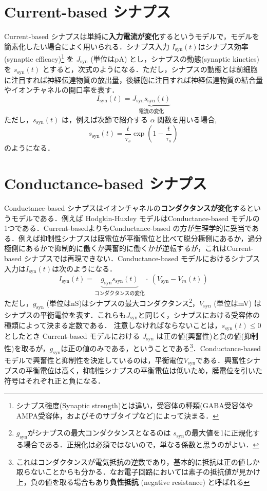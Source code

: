 \section{Current-based シナプス}
Current-based シナプスは単純に\textbf{入力電流が変化}するというモデルで，モデルを簡素化したい場合によく用いられる．シナプス入力 $I_{\text{syn}}(t)$はシナプス効率(synaptic efficacy)\footnote{シナプス強度(Synaptic strength)とは違い，受容体の種類(GABA受容体やAMPA受容体，およびそのサブタイプなど)によって決まる．} を $J_{\text{syn}}$ (単位はpA) とし，シナプスの動態(synaptic kinetics)を $s_{\text{syn}}(t)$ とすると，次式のようになる．ただし，シナプスの動態とは前細胞に注目すれば神経伝達物質の放出量，後細胞に注目すれば神経伝達物質の結合量やイオンチャネルの開口率を表す．
\begin{equation}
I_{\text{syn}}(t)=\underbrace{J_{\text{syn}}s_{\text{syn}}(t)}_{電流の変化}    
\end{equation}
ただし，$s_{\text{syn}}(t)$ は，例えば次節で紹介する $\alpha$ 関数を用いる場合, 
\begin{equation}
s_{\text{syn}}(t)=\dfrac{t}{\tau_s} \exp \left(1-\dfrac{t}{\tau_s}\right)    
\end{equation}
のようになる．
\section{Conductance-based シナプス}
Conductance-based シナプスはイオンチャネルの\textbf{コンダクタンスが変化}するというモデルである．例えば Hodgkin-Huxley モデルはConductance-based モデルの1つである．Current-basedよりもConductance-based の方が生理学的に妥当である．例えば抑制性シナプスは膜電位が平衡電位と比べて脱分極側にあるか，過分極側にあるかで抑制的に働くか興奮的に働くかが逆転するが，これはCurrent-based シナプスでは再現できない．Conductance-based モデルにおけるシナプス入力は$I_{\text{syn}}(t)$は次のようになる． 
\begin{equation}
I_{\text{syn}}(t)=\underbrace{g_{\text{syn}}s_{\text{syn}}(t)}_{コンダクタンスの変化}\cdot\ \left(V_{\text{syn}}-V_{m}(t)\right)    
\end{equation}
ただし，$g_{\text{syn}}$ (単位はnS)はシナプスの最大コンダクタンス\footnote{$g_{\text{syn}}$がシナプスの最大コンダクタンスとなるのは $s_{\text{syn}}$の最大値を1に正規化する場合である．正規化は必須ではないので，単なる係数と思うのがよい．}，$V_{\text{syn}}$ (単位はmV) はシナプスの平衡電位を表す．これらも$J_{\text{syn}}$と同じく，シナプスにおける受容体の種類によって決まる定数である．
注意しなければならないことは，$s_{\text{syn}}(t)\leq 0$としたとき Current-based モデルにおける $J_{\text{syn}}$ は正の値(興奮性)と負の値(抑制性)を取るが，$g_{\text{syn}}$は正の値のみである，ということである\footnote{これはコンダクタンスが電気抵抗の逆数であり，基本的に抵抗は正の値しか取らないことからも分かる．なお電子回路においては素子の抵抗値が見かけ上，負の値を取る場合もあり\textbf{負性抵抗} (negative resistance) と呼ばれる}．Conductance-basedモデルで興奮性と抑制性を決定しているのは，平衡電位$V_{\text{syn}}$である．興奮性シナプスの平衡電位は高く，抑制性シナプスの平衡電位は低いため，膜電位を引いた符号はそれぞれ正と負になる．
